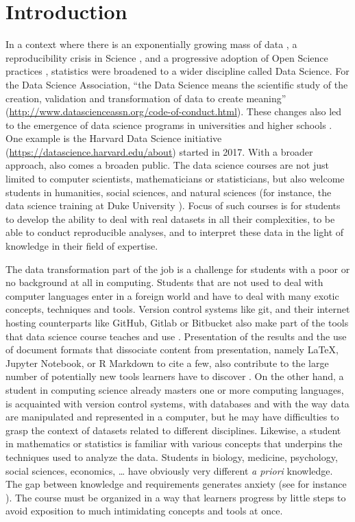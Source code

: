 \documentclass{aims}
\theoremstyle{definition}
\begin{document}
\hypertarget{introduction}{%
\section{Introduction}\label{introduction}}

In a context where there is an exponentially growing mass of data
\cite{Marx2013}, a reproducibility crisis in Science \cite{Baker2016},
and a progressive adoption of Open Science practices \cite{Banks2019},
statistics were broadened to a wider discipline called Data Science. For
the Data Science Association, ``the Data Science means the scientific
study of the creation, validation and transformation of data to create
meaning'' (\url{http://www.datascienceassn.org/code-of-conduct.html}).
These changes also led to the emergence of data science programs in
universities and higher schools \cite{Donoho2017, Cetinkaya-Rundel2021}.
One example is the Harvard Data Science initiative
(\url{https://datascience.harvard.edu/about}) started in 2017. With a
broader approach, also comes a broaden public. The data science courses
are not just limited to computer scientists, mathematicians or
statisticians, but also welcome students in humanities, social sciences,
and natural sciences (for instance, the data science training at Duke
University \cite{Cetinkaya-Rundel2021}). Focus of such courses is for
students to develop the ability to deal with real datasets in all their
complexities, to be able to conduct reproducible analyses, and to
interpret these data in the light of knowledge in their field of
expertise.

The data transformation part of the job is a challenge for students with
a poor or no background at all in computing. Students that are not used
to deal with computer languages enter in a foreign world and have to
deal with many exotic concepts, techniques and tools. Version control
systems like git, and their internet hosting counterparts like GitHub,
Gitlab or Bitbucket also make part of the tools that data science course
teaches and use \cite{Fiksel2019, Hsing2019}. Presentation of the
results and the use of document formats that dissociate content from
presentation, namely LaTeX, Jupyter Notebook, or R Markdown to cite a
few, also contribute to the large number of potentially new tools
learners have to discover \cite{Baumer2014}. On the other hand, a
student in computing science already masters one or more computing
languages, is acquainted with version control systems, with databases
and with the way data are manipulated and represented in a computer, but
he may have difficulties to grasp the context of datasets related to
different disciplines. Likewise, a student in mathematics or statistics
is familiar with various concepts that underpins the techniques used to
analyze the data. Students in biology, medicine, psychology, social
sciences, economics, \ldots{} have obviously very different \emph{a
priori} knowledge. The gap between knowledge and requirements generates
anxiety (see for instance \cite{Onwuegbuzie2003}). The course must be
organized in a way that learners progress by little steps to avoid
exposition to much intimidating concepts and tools at once.
\end{document}
